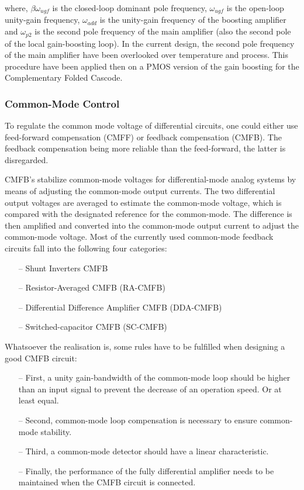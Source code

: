 where, \(\beta\omega_{ugf} \) is the closed-loop dominant pole frequency, \(\omega_{ugf} \) is the open-loop unity-gain frequency, \(\omega_{add} \) is the unity-gain frequency of the boosting amplifier and \(\omega_{p2} \) is the second pole frequency of the main amplifier (also the second pole of the local gain-boosting loop). In the current design, the second pole frequency of the main amplifier have been overlooked over temperature and process. This procedure have been applied then on a PMOS version of the gain boosting for the Complementary Folded Cascode.

\subsubsection{Common-Mode Control}
To regulate the common mode voltage of differential circuits, one could either use feed-forward compensation (CMFF) or feedback compensation (CMFB). The feedback compensation being more reliable than the feed-forward, the latter is disregarded.

CMFB’s stabilize common-mode voltages for differential-mode analog systems by means of adjusting the common-mode output currents. The two differential output voltages are averaged to estimate the common-mode voltage, which is compared with the designated reference for the common-mode. The difference is then amplified and converted into the common-mode output current to adjust the common-mode voltage. Most of the currently used common-mode feedback circuits fall into the following four categories:

\begin{itemize}
    \itemsep-0.5em
    \item[--] Shunt Inverters CMFB
    \item[--] Resistor-Averaged CMFB (RA-CMFB)
    \item[--] Differential Difference Amplifier CMFB (DDA-CMFB)
    \item[--] Switched-capacitor CMFB (SC-CMFB)
\end{itemize}

Whatsoever the realisation is, some rules have to be fulfilled when designing a good CMFB circuit:

\begin{itemize}
    \itemsep-0.5em
    \item[--] First, a unity gain-bandwidth of the common-mode loop should be higher than an input signal to prevent the decrease of an operation speed. Or at least equal.
    \item[--] Second, common-mode loop compensation is necessary to ensure common-mode stability.
    \item[--] Third, a common-mode detector should have a linear characteristic.
    \item[--] Finally, the performance of the fully differential amplifier needs to be maintained when the CMFB circuit is connected.
\end{itemize}

